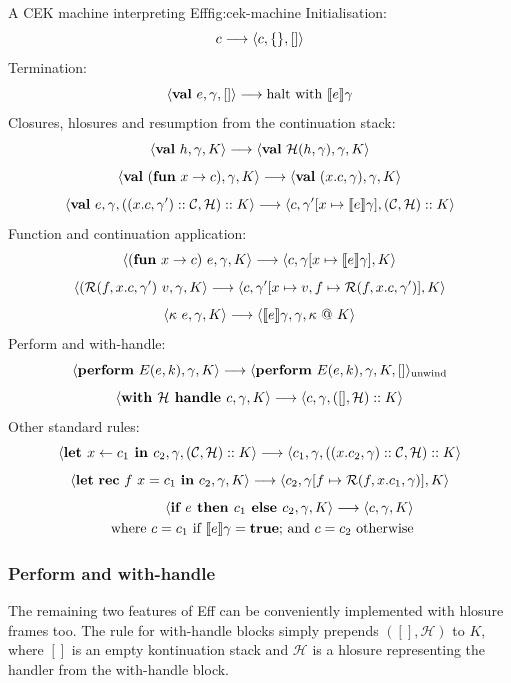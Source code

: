 \documentclass[class=article, crop=false]{standalone}
\begin{document}
\begin{myfigure}[0.9]{A CEK machine interpreting Eff}{fig:cek-machine}
    Initialisation:
    $$ c \longrightarrow \langle c, \{\}, [] \rangle $$
    Termination:
    $$ \langle  \mathbf{val}\  e, \gamma, []  \rangle \longrightarrow \text{halt with } \llbracket e \rrbracket\gamma$$
    Closures, hlosures and resumption from the continuation stack:
    $$ \langle  \mathbf{val}\  h, \gamma, K \rangle \longrightarrow \langle \mathbf{val}\  \mathcal{H}(h, \gamma), \gamma, K \rangle $$
    $$ \langle  \mathbf{val}\  (\mathbf{fun}\  x \to c), \gamma, K \rangle \longrightarrow \langle \mathbf{val}\  (x.c, \gamma), \gamma, K  \rangle $$
    $$ \langle  \mathbf{val}\  e, \gamma, ((x.c, \gamma') :: \mathcal{C}, \mathcal{H}) :: K  \rangle \longrightarrow
        \langle c, \gamma'[x \mapsto \llbracket e \rrbracket\gamma], (\mathcal{C}, \mathcal{H}) :: K \rangle $$
    Function and continuation application:
    $$ \langle  (\mathbf{fun}\  x \to c)\ e, \gamma, K \rangle \longrightarrow \langle c, \gamma[x \mapsto \llbracket e \rrbracket\gamma], K  \rangle $$
    $$ \langle  (\mathcal{R}(f, x.c, \gamma')\ v, \gamma, K \rangle \longrightarrow \langle c, \gamma'[x \mapsto v, f \mapsto \mathcal{R}(f, x.c, \gamma')], K  \rangle $$
    $$ \langle \kappa\ e, \gamma, K  \rangle \longrightarrow \langle  \llbracket e \rrbracket \gamma, \gamma, \kappa\ @\ K  \rangle $$
    Perform and with-handle:
    $$ \langle  \mathbf{perform}\  E(e,k), \gamma, K  \rangle \longrightarrow \langle  \mathbf{perform}\  E(e,k), \gamma, K, []  \rangle_{\text{unwind}} $$
    $$ \langle  \textbf{with } \mathcal{H} \textbf{ handle } c, \gamma, K  \rangle \longrightarrow \langle  c, \gamma, ([], \mathcal{H}) :: K  \rangle $$
    Other standard rules:
    $$ \langle  \textbf{let } x \leftarrow c_1 \textbf{ in } c_2, \gamma, (\mathcal{C}, \mathcal{H}) :: K \rangle \longrightarrow 
    \langle  c_1, \gamma, ((x. c_2, \gamma) :: \mathcal{C}, \mathcal{H}) :: K  \rangle $$
    $$ \langle \mathbf{let}\  \mathbf{rec}\  f\ x = c_1 \ \mathbf{in}\  c_2, \gamma, K \rangle \longrightarrow
    \langle c_2, \gamma[f \mapsto \mathcal{R}(f, x.c_1, \gamma)], K \rangle $$
    \begin{align*}
    \langle  \textbf{if } e \textbf{ then } c_1 \textbf{ else } c_2, \gamma, K  \rangle \longrightarrow \langle  c, \gamma, K  \rangle \\
    \text{ where $c = c_1$ if $\llbracket e \rrbracket \gamma = \textbf{true}$; and $c = c_2$ otherwise}
    \end{align*}
\end{myfigure}

\subsubsection{Perform and with-handle}

The remaining two features of Eff can be conveniently implemented with hlosure
frames too. The rule for with-handle blocks simply prepends $([], \mathcal{H})$
to $K$, where $[]$ is an empty kontinuation stack and $\mathcal{H}$ is a
hlosure representing the handler from the with-handle block.
\end{document}
